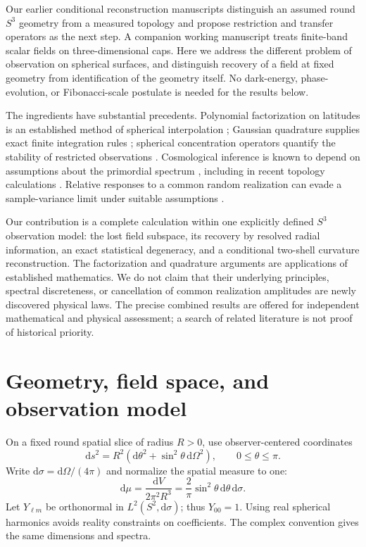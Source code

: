 \documentclass[aps,prd,reprint,amsmath,amssymb,nofootinbib,
longbibliography]{revtex4-2}
\newcommand{\dd}{\mathrm d}
\begin{document}
Our earlier conditional reconstruction manuscripts \cite{P09,P10}
distinguish an assumed round $S^3$ geometry from a measured
topology and propose restriction and transfer operators as the next step.
A companion working manuscript \cite{CapDraft} treats finite-band scalar
fields on three-dimensional caps. Here we address the different problem
of observation on spherical surfaces, and distinguish recovery of a field
at fixed geometry from identification of the geometry itself.
No dark-energy, phase-evolution, or Fibonacci-scale postulate is needed
for the results below.

The ingredients have substantial precedents. Polynomial factorization on
latitudes is an established method of spherical interpolation
\cite{Castell}; Gaussian quadrature supplies exact finite integration rules
\cite{DLMFQuad}; spherical concentration operators quantify the stability
of restricted observations \cite{Simons}. Cosmological inference is known
to depend on assumptions about the primordial spectrum \cite{Kinney},
including in recent topology calculations \cite{Samandar}. Relative
responses to a common random realization can evade a sample-variance
limit under suitable assumptions \cite{Abramo}.

Our contribution is a complete calculation within one explicitly defined
$S^3$ observation model: the lost field subspace, its recovery by resolved
radial information, an exact statistical degeneracy, and a conditional
two-shell curvature reconstruction. The factorization and quadrature
arguments are applications of established mathematics. We do not claim
that their underlying principles, spectral discreteness, or cancellation
of common realization amplitudes are newly discovered physical laws.
The precise combined results are offered for independent mathematical
and physical assessment; a search of related literature is not proof of
historical priority.

\section{Geometry, field space, and observation model}
\label{sec:model}

On a fixed round spatial slice of radius $R>0$, use observer-centered
coordinates
\begin{equation}
 \dd s^2=R^2(\dd\theta^2+\sin^2\theta\,\dd\Omega^2),
 \qquad 0\leq\theta\leq\pi .
\end{equation}
Write $\dd\sigma=\dd\Omega/(4\pi)$ and normalize the spatial measure to one:
\begin{equation}
 \dd\mu=\frac{\dd V}{2\pi^2R^3}
 =\frac{2}{\pi}\sin^2\theta\,\dd\theta\,\dd\sigma .
 \label{eq:measure}
\end{equation}
Let $Y_{\ell m}$ be orthonormal in $L^2(S^2,\dd\sigma)$; thus $Y_{00}=1$.
Using real spherical harmonics avoids reality constraints on coefficients.
The complex convention gives the same dimensions and spectra.
\end{document}
